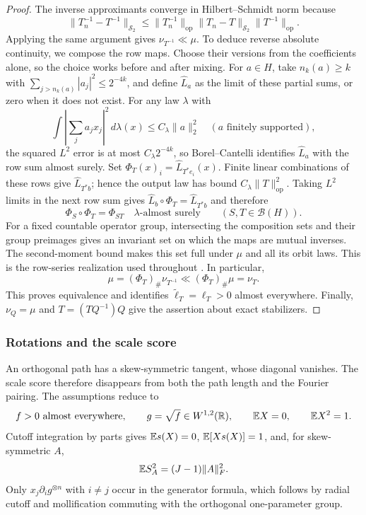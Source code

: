 \begin{proof}
The inverse approximants converge in Hilbert--Schmidt norm because
\[
 \|T_n^{-1}-T^{-1}\|_{\mathcal S_2}
 \le\|T_n^{-1}\|_{\mathrm{op}}
       \|T_n-T\|_{\mathcal S_2}\|T^{-1}\|_{\mathrm{op}}.
\]
Applying the same argument gives $\nu_{T^{-1}}\ll\mu$. To deduce
reverse absolute continuity, we compose the row maps. Choose their versions
from the coefficients alone, so the choice works before and after mixing.
For \(a\in H\), take \(n_k(a)\ge k\) with
\(\sum_{j>n_k(a)}|a_j|^2\le2^{-4k}\), and define \(\widehat L_a\) as the
limit of these partial sums, or zero when it does not exist. For any law
\(\lambda\) with
\begin{equation}
 \int\left|\sum_j a_jx_j\right|^2\,d\lambda(x)
       \le C_\lambda\|a\|_2^2
       \quad(a\text{ finitely supported}),
 \label{eq:covariance-domination}
\end{equation}
the squared \(L^2\) error is at most \(C_\lambda2^{-4k}\), so
Borel--Cantelli identifies \(\widehat L_a\) with the row sum almost surely.
Set \(\Phi_T(x)_i=\widehat L_{T^*e_i}(x)\). Finite linear combinations
of these rows give \(\widehat L_{T^*b}\); hence the output law has bound
\(C_\lambda\|T\|_{\mathrm{op}}^2\). Taking \(L^2\) limits in the next
row sum gives \(\widehat L_b\circ\Phi_T=\widehat L_{T^*b}\) and therefore
\begin{equation}
 \Phi_S\circ\Phi_T=\Phi_{ST}\quad\lambda\text{-almost surely}
       \qquad(S,T\in\mathcal B(H)).
 \label{eq:measurable-composition}
\end{equation}
For a fixed countable operator group, intersecting the composition sets
and their group preimages gives an invariant set on which the maps are
mutual inverses. The second-moment bound makes this set full under
\(\mu\) and all its orbit laws. This is the row-series realization used
throughout \cite{shimomura1977linear}. In particular,
\[
 \mu=(\Phi_T)_\#\nu_{T^{-1}}
       \ll(\Phi_T)_\#\mu=\nu_T.
\]
This proves equivalence and identifies
$\widetilde\ell_T=\ell_T>0$ almost everywhere.
Finally, $\nu_Q=\mu$ and $T=(TQ^{-1})Q$ give the assertion about exact
stabilizers.
\end{proof}

\subsubsection{Rotations and the scale score}

An orthogonal path has a skew-symmetric tangent, whose diagonal vanishes.
The scale score therefore disappears from both the path length and the
Fourier pairing. The assumptions reduce to
\begin{equation}
 f>0\ \text{almost everywhere},\qquad
 g=\sqrt f\in W^{1,2}(\mathbb R),\qquad
 \mathbb E X=0,\qquad\mathbb E X^2=1.
 \label{eq:orthogonal-fisher-regularity}
\end{equation}
Cutoff integration by parts gives \(\mathbb E s(X)=0\), \(\mathbb E[Xs(X)]=1\), and,
for skew-symmetric \(A\),
\begin{equation}
 \mathbb E S_A^2=(J-1)\|A\|_F^2.
\end{equation}
Only \(x_j\partial_ig^{\otimes n}\) with \(i\ne j\) occur in the generator formula,
which follows by radial cutoff and mollification commuting with the orthogonal
one-parameter group.

